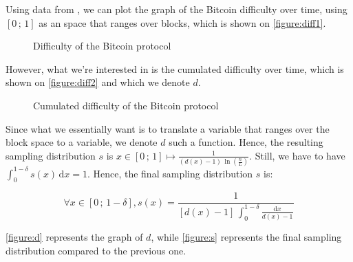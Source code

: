         Using data from \cite{BTCDifficulty}, we can plot the graph of the Bitcoin difficulty over time, using \([0\,;\,1]\) as an space that ranges over blocks, which is shown on \autoref{figure:diff1}.
        
        \begin{figure}[ht]
          \centering
          \caption{Difficulty of the Bitcoin protocol}
          \label{figure:diff1}
        \end{figure}
        
        However, what we're interested in is the cumulated difficulty over time, which is shown on \autoref{figure:diff2} and which we denote \(d\).
        
        \begin{figure}[ht]
          \centering
          \caption{Cumulated difficulty of the Bitcoin protocol}
          \label{figure:diff2}
        \end{figure}
        
        Since what we essentially want is to translate a variable that ranges over the block space to a variable, we denote \(d\) such a function. Hence, the resulting sampling distribution \(s\) is \(x\in[0\,;\,1]\mapsto\frac{1}{(d(x) - 1)\,\ln\left(\frac{n}{L}\right)}\). Still, we have to have \(\int_0^{1-\delta}s(x)\,\mathrm{d}x=1\). Hence, the final sampling distribution \(s\) is:
        
        \[\forall x\in[0\,;\,1-\delta],s(x)=\frac{1}{[d(x)-1]\,\int_{0}^{1-\delta}\frac{\mathrm{d}x}{d(x)-1}}\]
        
        \autoref{figure:d} represents the graph of \(d\), while \autoref{figure:s} represents the final sampling distribution compared to the previous one.
                
